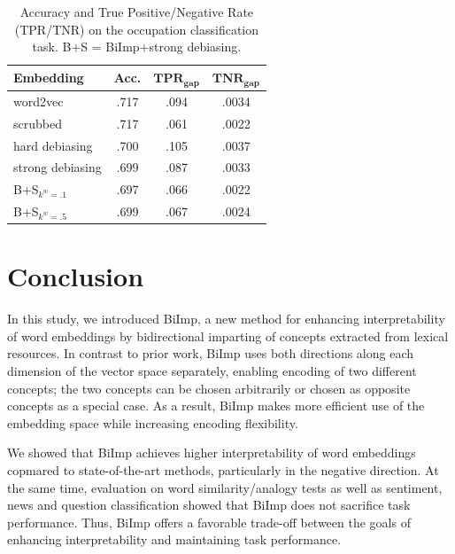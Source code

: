 \documentclass[11pt,a4paper]{article}
\def\proposedmethod{BiImp}
\begin{document}
\begin{table}
    \centering
	\begin{tabular}{lccc}
	    \hline \hline
        \textbf{Embedding} & \textbf{Acc.} & $\textbf{TPR}_{\textbf{gap}}$ & $\textbf{TNR}_{\textbf{gap}}$ \\\hline \hline %
        word2vec & .717 & .094 & .0034 \\
        scrubbed & .717 & .061 & .0022 \\
        hard debiasing & .700 & .105 & .0037 \\
        strong debiasing & .699 & .087 & .0033 \\
        B+S$_{k^w=.1}$ & .697 & .066 & .0022 \\
        B+S$_{k^w=.5}$ & .699 & .067 & .0024 \\
        \hline \hline
	\end{tabular}
	\caption{Accuracy and True Positive/Negative Rate
          (TPR/TNR) on the occupation classification
          task. B+S = \proposedmethod{}+strong debiasing.}
	\label{tab:biosbias}
\end{table}

\section{Conclusion} \label{sec:concl}

In this study, we introduced \proposedmethod{}, a new method for enhancing
interpretability of word embeddings by bidirectional
imparting of concepts extracted from lexical resources. 
In contrast to prior work, \proposedmethod{}
uses  both directions along each
dimension of the vector space separately, enabling encoding
of two different concepts; the two concepts can be chosen arbitrarily
or chosen as opposite concepts as a special case.  As a
result,
\proposedmethod{}
 makes more efficient use of
the embedding space while increasing encoding flexibility.

We showed that  \proposedmethod{}
achieves higher interpretability of word embeddings copmared to
state-of-the-art methods, particularly in the negative
direction. At the same time, evaluation on word
similarity/analogy tests as well as sentiment, news and
question classification  showed that \proposedmethod{} does
not sacrifice task performance.
Thus, \proposedmethod{} offers a favorable
trade-off between the goals of enhancing
interpretability and maintaining task performance.
\end{document}
